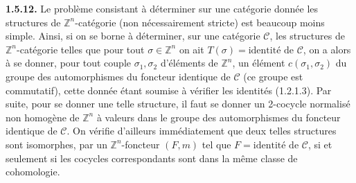 \noindent\textbf{1.5.12.}\quad
Le problème consistant à déterminer sur une catégorie donnée les
structures de $\mathbb Z^n$-catégorie (non nécessairement stricte) est
beaucoup moins simple. Ainsi, si on se borne à déterminer, sur une
catégorie $\mathcal C$, les structures de $\mathbb Z^n$-catégorie
telles que pour tout $\sigma\in\mathbb Z^n$ on ait
$T(\sigma)=\text{identité de }\mathcal C$, on a alors à se donner,
pour tout couple $\sigma_1,\sigma_2$ d'éléments de $\mathbb Z^n$, un
élément $c(\sigma_1,\sigma_2)$ du groupe des automorphismes du foncteur
identique de $\mathcal C$ (ce groupe est commutatif), cette donnée étant
soumise à vérifier les identités (1.2.1.3). Par suite, pour se donner une
telle structure, il faut se donner un 2-cocycle normalisé non homogène de
$\mathbb Z^n$ à valeurs dans le groupe des automorphismes du foncteur
identique de $\mathcal C$. On vérifie d'ailleurs immédiatement que deux
telles structures sont isomorphes, par un $\mathbb Z^n$-foncteur
$(F,m)$ tel que $F=\text{identité de }\mathcal C$, si et seulement si
les cocycles correspondants sont dans la même classe de cohomologie.
